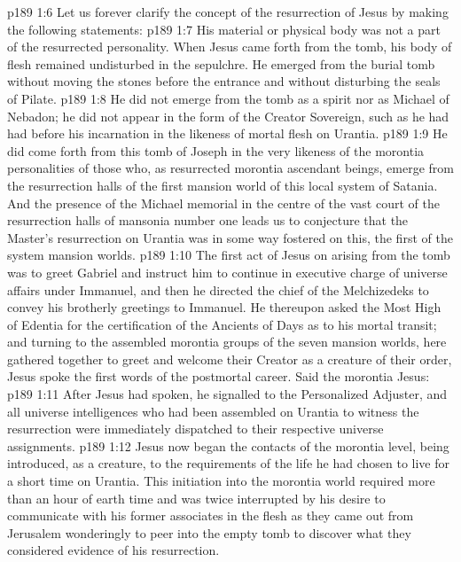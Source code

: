 \vs p189 1:6 Let us forever clarify the concept of the resurrection of Jesus by making the following statements:
\vs p189 1:7 \bibnobreakspace His material or physical body was not a part of the resurrected personality. When Jesus came forth from the tomb, his body of flesh remained undisturbed in the sepulchre. He emerged from the burial tomb without moving the stones before the entrance and without disturbing the seals of Pilate.
\vs p189 1:8 \bibnobreakspace He did not emerge from the tomb as a spirit nor as Michael of Nebadon; he did not appear in the form of the Creator Sovereign, such as he had had before his incarnation in the likeness of mortal flesh on Urantia.
\vs p189 1:9 \bibnobreakspace He did come forth from this tomb of Joseph in the very likeness of the morontia personalities of those who, as resurrected morontia ascendant beings, emerge from the resurrection halls of the first mansion world of this local system of Satania. And the presence of the Michael memorial in the centre of the vast court of the resurrection halls of mansonia number one leads us to conjecture that the Master’s resurrection on Urantia was in some way fostered on this, the first of the system mansion worlds.
\vs p189 1:10 \pc The first act of Jesus on arising from the tomb was to greet Gabriel and instruct him to continue in executive charge of universe affairs under Immanuel, and then he directed the chief of the Melchizedeks to convey his brotherly greetings to Immanuel. He thereupon asked the Most High of Edentia for the certification of the Ancients of Days as to his mortal transit; and turning to the assembled morontia groups of the seven mansion worlds, here gathered together to greet and welcome their Creator as a creature of their order, Jesus spoke the first words of the postmortal career. Said the morontia Jesus: 
\vs p189 1:11 After Jesus had spoken, he signalled to the Personalized Adjuster, and all universe intelligences who had been assembled on Urantia to witness the resurrection were immediately dispatched to their respective universe assignments.
\vs p189 1:12 Jesus now began the contacts of the morontia level, being introduced, as a creature, to the requirements of the life he had chosen to live for a short time on Urantia. This initiation into the morontia world required more than an hour of earth time and was twice interrupted by his desire to communicate with his former associates in the flesh as they came out from Jerusalem wonderingly to peer into the empty tomb to discover what they considered evidence of his resurrection.
